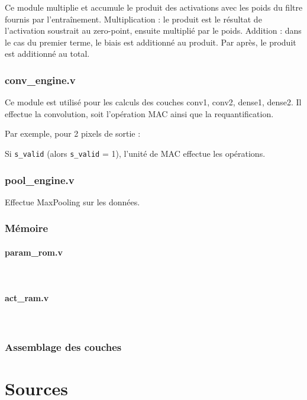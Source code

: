 \documentclass[11pt,a4paper]{article}
\begin{document}
Ce module multiplie et accumule le produit des activations avec les poids du
filtre fournis par l'entraînement. Multiplication : le produit est le
résultat de l'activation soustrait au zero-point, ensuite multiplié par le
poids. Addition : dans le cas du premier terme, le biais est additionné au
produit. Par après, le produit est additionné au total.

\subsubsection{conv\_engine.v}

Ce module est utilisé pour les calculs des couches conv1, conv2, dense1,
dense2. Il effectue la convolution, soit l'opération MAC ainsi que la
requantification.

Par exemple, pour 2 pixels de sortie :

Si \texttt{s\_valid} (alors \texttt{s\_valid} = 1), l'unité de MAC effectue
les opérations.

\subsubsection{pool\_engine.v}

Effectue MaxPooling sur les données.

\subsubsection{Mémoire}

\paragraph{param\_rom.v}\mbox{}\\

\paragraph{act\_ram.v}\mbox{}\\

\subsubsection{Assemblage des couches}

\section*{Sources}
\end{document}
